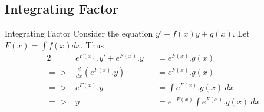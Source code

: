 \documentclass[11pt,a4paper]{article}
\begin{document}
\subsection{Integrating Factor}
%
\subtitle{Theorem 6.04 - }{Integrating Factor}
Consider the equation $y' + f(x)y + g(x)$. Let $F(x) = \int{f(x)dx}$. Thus \begin{alignat*}{2}
  &e^{F(x)}.y' + e^{F(x)}.y &&= e^{F(x)}.g(x) \\
  => &\frac{d}{dx}\left(e^{F(x)}.y \right) &&= e^{F(x)}.g(x) \\
  => &e^{F(x)}.y &&= \int{e^{F(x)}.g(x)\ dx} \\
  => &y &&= e^{-F(x)} \int{e^{F(x)}.g(x)\ dx}
\end{alignat*}
\end{document}
